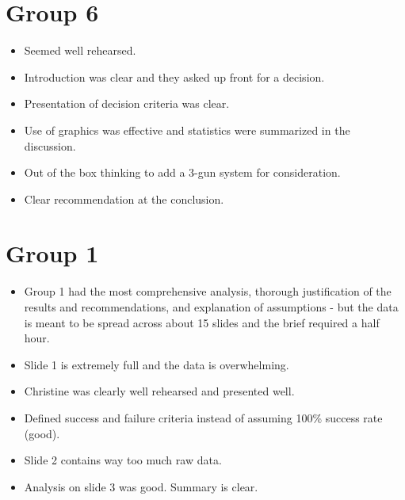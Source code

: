 \documentclass[letterpaper,12pt]{article}
\begin{document}
\section*{Group 6}
\begin{itemize}
  \item Seemed well rehearsed.
  \item Introduction was clear and they asked up front for a decision.
  \item Presentation of decision criteria was clear.
  \item Use of graphics was effective and statistics were summarized in the discussion.
  \item Out of the box thinking to add a 3-gun system for consideration.
  \item Clear recommendation at the conclusion.
\end{itemize}

\section*{Group 1}
\begin{itemize}
  \item Group 1 had the most comprehensive analysis, thorough justification of the results and recommendations, and explanation of assumptions - but the data is meant to be spread across about 15 slides and the brief required a half hour.      
  \item Slide 1 is extremely full and the data is overwhelming. 
  \item Christine was clearly well rehearsed and presented well. 
  \item Defined success and failure criteria instead of assuming 100\% success rate (good). 
  \item Slide 2 contains way too much raw data. 
  \item Analysis on slide 3 was good. Summary is clear.
\end{itemize}
\end{document}
